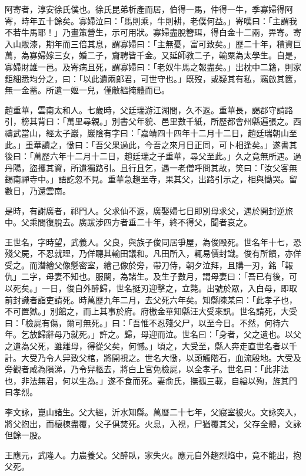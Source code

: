 \begin{pinyinscope}
阿寄者，淳安徐氏僕也。徐氏昆弟析產而居，伯得一馬，仲得一牛，季寡婦得阿寄，時年五十餘矣。寡婦泣曰：「馬則乘，牛則耕，老僕何益。」寄嘆曰：「主謂我不若牛馬耶！」乃畫策營生，示可用狀。寡婦盡脫簪珥，得白金十二兩，畀寄。寄入山販漆，期年而三倍其息，謂寡婦曰：「主無憂，富可致矣。」歷二十年，積資巨萬，為寡婦嫁三女，婚二子，齎聘皆千金。又延師教二子，輸粟為太學生。自是，寡婦財雄一邑。及寄病且死，謂寡婦曰：「老奴牛馬之報盡矣。」出枕中二籍，則家鉅細悉均分之，曰：「以此遺兩郎君，可世守也。」既歿，或疑其有私，竊啟其篋，無一金蓄。所遺一嫗一兒，僅敝縕掩體而已。

趙重華，雲南太和人。七歲時，父廷瑞游江湖間，久不返。重華長，謁郡守請路引，榜其背曰：「萬里尋親。」別書父年貌、邑里數千紙，所歷都會州縣遍張之。西禱武當山，經太子巖，巖陰有字曰：「嘉靖四十四年十二月十二日，趙廷瑞朝山至此。」重華讀之，慟曰：「吾父果過此，今吾之來月日正同，可卜相逢矣。」遂書其後曰：「萬歷六年十二月十二日，趙廷瑞之子重華，尋父至此。」久之竟無所遇。過丹陽，盜攫其資，所遺獨路引。且行且乞，遇一老僧呼問其故，笑曰：「汝父客無錫南禪寺中。」語訖忽不見。重華急趨至寺，果其父，出路引示之，相與慟哭。留數日，乃還雲南。

是時，有謝廣者，祁門人。父求仙不返，廣娶婦七日即別母求父，遇於開封逆旅中。父乘間復脫去。廣跋涉四方者垂二十年，終不得父，聞者哀之。

王世名，字時望，武義人。父良，與族子俊同居爭屋，為俊毆死。世名年十七，恐殘父屍，不忍就理，乃佯聽其輸田議和。凡田所入，輒易價封識。俊有所饋，亦佯受之。而潛繪父像懸密室，繪己像於旁，帶刀侍，朝夕泣拜，且購一刃，銘「報仇」二字，母妻不知也。服闋，為諸生。及生子數月，謂母妻曰：「吾已有後，可以死矣。」一日，俊自外醉歸，世名挺刃迎擊之，立斃。出號於眾，入白母，即取前封識者詣吏請死。時萬歷九年二月，去父死六年矣。知縣陳某曰：「此孝子也，不可置獄。」別館之，而上其事於府。府檄金華知縣汪大受來訊。世名請死，大受曰：「檢屍有傷，爾可無死。」曰：「吾惟不忍殘父尸，以至今日。不然，何待六年。乞放歸辭母乃就死。」許之。歸，母迎而泣。世名曰：「身者，父之遺也。以父之遺為父死，雖離母，得從父矣，何憾。」頃之，大受至，縣人奔走直世名者以千計。大受乃令人舁致父棺，將開視之。世名大慟，以頭觸階石，血流殷地。大受及旁觀者咸為隕涕，乃令舁柩去，將白上官免檢屍，以全孝子。世名曰：「此非法也，非法無君，何以生為。」遂不食而死。妻俞氏，撫孤三載，自縊以殉，旌其門曰孝烈。

李文詠，崑山諸生。父大經，沂水知縣。萬曆二十七年，父寢室被火。文詠突入，將父抱出，而榱棟盡覆，父子俱焚死。火息，入視，尸猶覆其父，父存全體，文詠但餘一股。

王應元，武隆人。力農養父。父醉臥，家失火。應元自外趨烈焰中，竟不能出，抱父死。


\end{pinyinscope}
